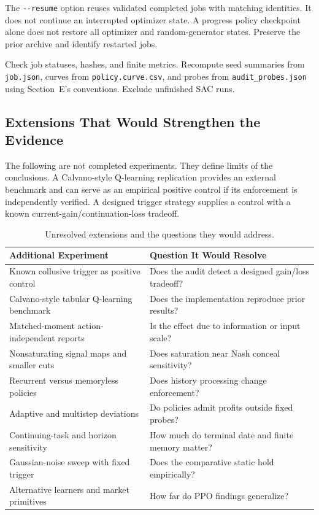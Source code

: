 \documentclass{article}
\begin{document}
The \texttt{-\/-resume} option reuses validated completed jobs with matching identities. It does not continue an interrupted optimizer state. A progress policy checkpoint alone does not restore all optimizer and random-generator states. Preserve the prior archive and identify restarted jobs.

Check job statuses, hashes, and finite metrics. Recompute seed summaries from \texttt{job.json}, curves from \texttt{policy.curve.csv}, and probes from \texttt{audit\_probes.json} using Section~E's conventions. Exclude unfinished SAC runs.

\subsection{Extensions That Would Strengthen the Evidence}

The following are not completed experiments. They define limits of the conclusions. A Calvano-style Q-learning replication provides an external benchmark and can serve as an empirical positive control if its enforcement is independently verified. A designed trigger strategy supplies a control with a known current-gain/continuation-loss tradeoff.

\begin{table}[t]
\centering
\caption{Unresolved extensions and the questions they would address.}
\label{tab:extensions}
\small
\begin{tabular}{@{}ll@{}}
\toprule
Additional Experiment & Question It Would Resolve \\
\midrule
Known collusive trigger as positive control & Does the audit detect a designed gain/loss tradeoff? \\
Calvano-style tabular Q-learning benchmark & Does the implementation reproduce prior results? \\
Matched-moment action-independent reports & Is the effect due to information or input scale? \\
Nonsaturating signal maps and smaller cuts & Does saturation near Nash conceal sensitivity? \\
Recurrent versus memoryless policies & Does history processing change enforcement? \\
Adaptive and multistep deviations & Do policies admit profits outside fixed probes? \\
Continuing-task and horizon sensitivity & How much do terminal date and finite memory matter? \\
Gaussian-noise sweep with fixed trigger & Does the comparative static hold empirically? \\
Alternative learners and market primitives & How far do PPO findings generalize? \\
\bottomrule
\end{tabular}
\end{table}
\end{document}
